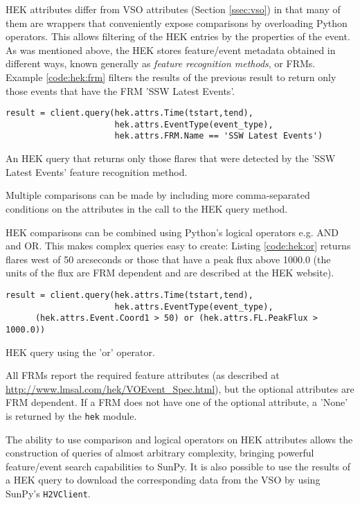 HEK attributes differ from VSO attributes (Section \ref{ssec:vso}) in that many 
of them are wrappers that conveniently expose comparisons by overloading Python 
operators.  This allows filtering of the HEK entries by the properties of the 
event.  As was mentioned above, the HEK stores feature/event metadata obtained 
in different ways, known generally as {\it feature recognition methods}, or 
FRMs. Example \ref{code:hek:frm} filters the results of the previous result to 
return only those events that have the FRM 'SSW Latest Events'.
\begin{listing}[H]
\begin{verbatim}
result = client.query(hek.attrs.Time(tstart,tend), 
                      hek.attrs.EventType(event_type),
                      hek.attrs.FRM.Name == 'SSW Latest Events')
\end{verbatim}
\caption{An HEK query that returns only those flares that were
  detected by the 'SSW Latest Events' feature recognition method.}
\label{code:hek:frm}
\end{listing}
Multiple comparisons can be made by including more comma-separated
conditions on the attributes in the call to the HEK query method.

HEK comparisons can be combined using Python’s logical operators e.g. AND
and OR. This makes complex queries easy to create: Listing \ref{code:hek:or} 
returns flares west of 50 arcseconds or those that have a peak flux above 
1000.0 (the units of the flux are FRM dependent and are described at the HEK 
website).
\begin{listing}[H]
\begin{verbatim}
result = client.query(hek.attrs.Time(tstart,tend), 
                      hek.attrs.EventType(event_type),
      (hek.attrs.Event.Coord1 > 50) or (hek.attrs.FL.PeakFlux > 1000.0))
\end{verbatim}
\caption{HEK query using the 'or' operator.}
\label{code:hek:or}
\end{listing}
All FRMs report the required feature attributes (as described at 
\url{http://www.lmsal.com/hek/VOEvent_Spec.html}), but the optional attributes 
are FRM dependent.  If a FRM does not have one of the optional attribute, a 
'None' is returned by the \texttt{hek} module. 

The ability to use comparison and logical operators on HEK attributes allows 
the construction of queries of almost arbitrary complexity, bringing powerful 
feature/event search capabilities to SunPy. It is also possible to use the 
results of a HEK query to download the corresponding data from the VSO by using 
SunPy's \texttt{H2VClient}.